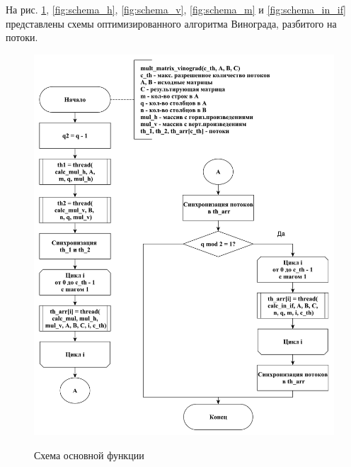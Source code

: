 \documentclass[a4paper,12pt]{article}
\begin{document}
	На рис. \ref{fig:schema_main}, \ref{fig:schema_h}, \ref{fig:schema_v}, \ref{fig:schema_m} и \ref{fig:schema_in_if} представлены схемы оптимизированного алгоритма Винограда, разбитого на потоки.
	    \begin{figure}[h!]
	    	\begin{center}
	    		{\includegraphics[scale = 0.5]{schema01.pdf}}
	    		\caption{Схема основной функции}
	    		\label{fig:schema_main}
	    	\end{center}
	    \end{figure}
	    
\end{document}
